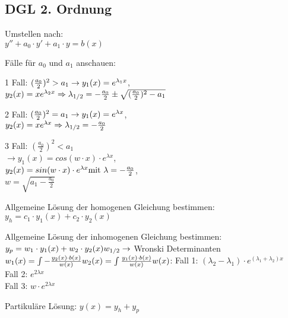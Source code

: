 \documentclass[a4paper, 8pt, landscape]{extarticle}
\let\oldint\int
\renewcommand{\int}{\ensuremath{\textstyle\oldint}}
\begin{document}
\begin{multicols*}{5}
			\subsection{DGL 2. Ordnung}
				\begin{compactenum}
					\item Umstellen nach:\\$y''+a_0\cdot y'+a_1\cdot y=b(x)$
					\item Fälle für $a_0$ und $a_1$ anschauen:
					\begin{compactenum}
						\item[1 Fall:] $(\frac{a_0}{2})^2>a_1\\
						\rightarrow y_1(x)=e^{\lambda_1x}$,\\ $y_2(x)=xe^{\lambda_2x}\\
						\Rightarrow \lambda_{1/2}=-\frac{a_0}{2}\pm\sqrt{(\frac{a_0}{2})^2-a_1}$
						\item[2 Fall:] $(\frac{a_0}{2})^2=a_1\\
						\rightarrow y_1(x)=e^{\lambda x}$,\\ $y_2(x)=xe^{\lambda x}\\
						\Rightarrow \lambda_{1/2}=-\frac{a_0}{2}$
						\item[3 Fall:] $(\frac{a_0}{2})^2<a_1$\\
						$\rightarrow y_1(x)=cos(w\cdot x)\cdot e^{\lambda x}$,\\
						$y_2(x)=sin(w\cdot x)\cdot e^{\lambda x}\\
						\text{mit } \lambda=-\frac{a_0}{2}$,\\ $w=\sqrt{a_1-\frac{a_0}{2}}$
					\end{compactenum}
					\item Allgemeine Lösung der homogenen Gleichung bestimmen:\\
					$y_h=c_1\cdot y_1(x)+c_2\cdot y_2(x)$
					\item Allgemeine Lösung der inhomogenen Gleichung bestimmen:\\
					$y_p=w_1\cdot y_1(x)+w_2\cdot y_2(x)\\
					w_{1/2} \rightarrow$ Wronski Determinanten\\
					$w_1(x)=\int-\frac{y_2(x)\cdot b(x)}{w(x)}\\
					w_2(x)=\int\frac{y_1(x)\cdot b(x)}{w(x)}\\
					w(x)$: Fall 1: $(\lambda_2-\lambda_1)\cdot e^{(\lambda_1+\lambda_2)x}$\\
					Fall 2: $e^{2\lambda x}$\\
					Fall 3: $w\cdot e^{2\lambda x}$
					\item Partikuläre Lösung: $y(x)=y_h+y_p$
				\end{compactenum}
\end{multicols*}
\end{document}
